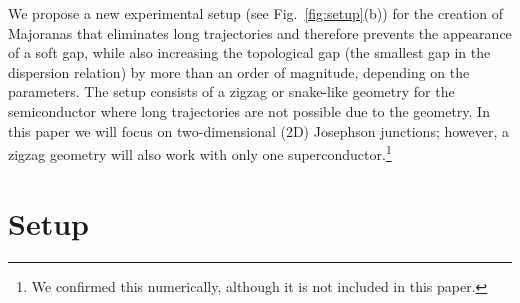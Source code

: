 \documentclass[english, twocolumn, 10pt, aps, superscriptaddress, floatfix, prb, citeautoscript]{revtex4-1}
\renewcommand{\comment}[2]{#2}
\begin{document}
\comment{We show that zigzag geometry solves this problem by eliminating the long trajectories.}
We propose a new experimental setup (see Fig.~\ref{fig:setup}(b)) for the creation of Majoranas that eliminates long trajectories and therefore prevents the appearance of a soft gap, while also increasing the topological gap (the smallest gap in the dispersion relation) by more than an order of magnitude, depending on the parameters.
The setup consists of a zigzag or snake-like geometry for the semiconductor where long trajectories are not possible due to the geometry.
In this paper we will focus on two-dimensional (2D) Josephson junctions; however, a zigzag geometry will also work with only one superconductor.\footnote{We confirmed this numerically, although it is not included in this paper.}


\section{Setup}\label{sec:setup}
\end{document}
